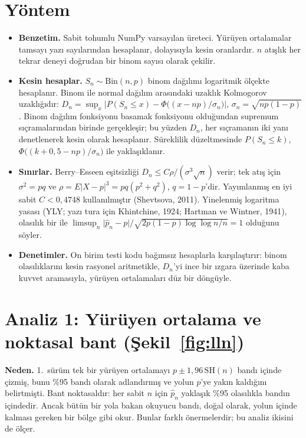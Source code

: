 \documentclass[11pt,a4paper]{article}
\begin{document}
\section{Yöntem}

\begin{itemize}
  \item \textbf{Benzetim.} Sabit tohumlu NumPy varsayılan üreteci. Yürüyen ortalamalar tamsayı yazı sayılarından hesaplanır,
  dolayısıyla kesin oranlardır. $n$ atışlık her tekrar deneyi doğrudan bir binom sayısı olarak çekilir.
  \item \textbf{Kesin hesaplar.} $S_n \sim \mathrm{Bin}(n,p)$ binom dağılımı logaritmik ölçekte hesaplanır. Binom ile normal
  dağılım arasındaki uzaklık Kolmogorov uzaklığıdır: $D_n = \sup_x \lvert P(S_n \le x) - \Phi\bigl((x-np)/\sigma_n\bigr)\rvert$,
  $\sigma_n = \sqrt{np(1-p)}$. Binom dağılım fonksiyonu basamak fonksiyonu olduğundan supremum sıçramalarından birinde
  gerçekleşir; bu yüzden $D_n$, her sıçramanın iki yanı denetlenerek kesin olarak hesaplanır. Süreklilik düzeltmesinde
  $P(S_n \le k)$, $\Phi\bigl((k+0{,}5-np)/\sigma_n\bigr)$ ile yaklaşıklanır.
  \item \textbf{Sınırlar.} Berry--Esseen eşitsizliği $D_n \le C\rho/(\sigma^3\sqrt n)$ verir; tek atış için $\sigma^2 = pq$ ve
  $\rho = E|X-p|^3 = pq(p^2+q^2)$, $q = 1-p$'dir. Yayımlanmış en iyi sabit $C < 0{,}4748$ kullanılmıştır (Shevtsova, 2011).
  Yinelenmiş logaritma yasası (YLY; yazı tura için Khintchine, 1924; Hartman ve Wintner, 1941), olasılık bir ile
  $\limsup_n \lvert\hat p_n - p\rvert / \sqrt{2p(1-p)\log\log n/n} = 1$ olduğunu söyler.
  \item \textbf{Denetimler.} On birim testi kodu bağımsız hesaplarla karşılaştırır: binom olasılıklarını kesin rasyonel
  aritmetikle, $D_n$'yi ince bir ızgara üzerinde kaba kuvvet aramasıyla, yürüyen ortalamaları düz bir döngüyle.
\end{itemize}

\section{Analiz 1: Yürüyen ortalama ve noktasal bant (Şekil~\ref{fig:lln})}

\textbf{Neden.} 1.\ sürüm tek bir yürüyen ortalamayı $p \pm 1{,}96\,\mathrm{SH}(n)$ bandı içinde çizmiş, bunu \%95 bandı olarak
adlandırmış ve yolun $p$'ye yakın kaldığını belirtmişti. Bant noktasaldır: her sabit $n$ için $\hat p_n$ yaklaşık \%95
olasılıkla bandın içindedir. Ancak bütün bir yola bakan okuyucu bandı, doğal olarak, yolun içinde kalması gereken bir bölge
gibi okur. Bunlar farklı önermelerdir; bu analiz ikisini de ölçer.
\end{document}
